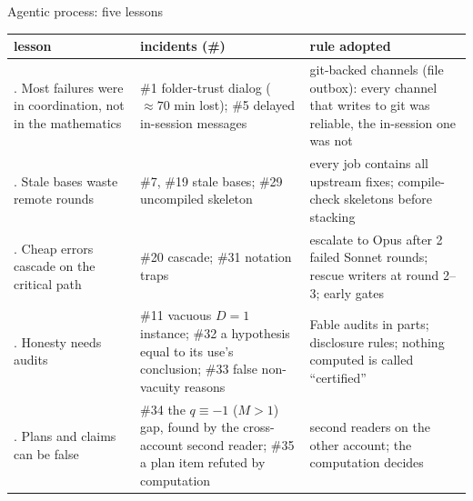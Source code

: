 \begin{frame}{Agentic process: five lessons}
  \footnotesize
  \setlength{\tabcolsep}{3pt}\renewcommand{\arraystretch}{1.0}
  \begin{tabular}{@{}>{\raggedright\arraybackslash}p{3.7cm} >{\raggedright\arraybackslash}p{4.7cm} >{\raggedright\arraybackslash}p{4.9cm}@{}}\toprule
    lesson & incidents (\#) & rule adopted\\\midrule
    1. Most failures were in coordination, not in the mathematics &
      \#1 folder-trust dialog ($\approx70$ min lost); \#5 delayed in-session messages &
      git-backed channels (file outbox): every channel that writes to git was reliable, the in-session one was not\\
    2. Stale bases waste remote rounds &
      \#7, \#19 stale bases; \#29 uncompiled skeleton &
      every job contains all upstream fixes; compile-check skeletons before stacking\\
    3. Cheap errors cascade on the critical path &
      \#20 cascade; \#31 notation traps &
      escalate to Opus after 2 failed Sonnet rounds; rescue writers at round 2--3; early gates\\
    4. Honesty needs audits &
      \#11 vacuous $D=1$ instance; \#32 a hypothesis equal to its use's conclusion; \#33 false non-vacuity reasons &
      Fable audits in parts; disclosure rules; nothing computed is called ``certified''\\
    5. Plans and claims can be false &
      \#34 the $q\equiv-1$ ($M>1$) gap, found by the cross-account second reader; \#35 a plan item refuted by computation &
      second readers on the other account; the computation decides\\\bottomrule
  \end{tabular}

\end{frame}
